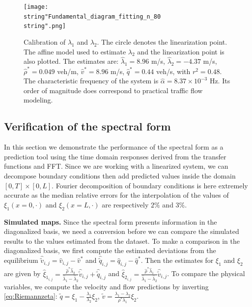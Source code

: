 \documentclass[5p,twocolumn]{elsarticle}
\begin{document}
\begin{figure}
\centering
\texttt{[image: \\string"Fundamental\_diagram\_fitting\_n\_80\\string".png]}
\protect\caption{Calibration of $\lambda_{1}$ and $\lambda_{2}$. The circle denotes the linearization point. The affine model used to estimate $\lambda_{2}$ and the linearization point is also plotted. The estimates are: $\widehat{\lambda}_{1}=8.96$ m/s, $\widehat{\lambda}_{2}=-4.37$ m/s, $\widehat{\rho}^{*}=0.049$ veh/m, $\widehat{v}^{*}=8.96$ m/s, $\widehat{q}^{*}=0.44$ veh/s, with $r^{2}=0.48$. The characteristic frequency of the system is $\widehat{\alpha} = 8.37\times10^{-3}$ Hz. Its order of magnitude does correspond to practical traffic flow modeling.}
\label{fig:Calibration-of-eigen-values}
\end{figure}

\subsection{Verification of the spectral form}
In this section we demonstrate the performance of the spectral form as a prediction tool using the time domain responses derived from the transfer functions and FFT. Since we are working with a linearized system, we can decompose boundary conditions then add predicted values inside the domain $\left[0,T\right]\times\left[0,L\right]$. Fourier decomposition of boundary conditions is here extremely accurate as the median relative errors for the interpolation of the values of $\xi_{1}\left(x=0, \cdot \right)$ and $\xi_{2}\left(x=L, \cdot \right)$ are respectively $2\%$ and $3\%$.

\textbf{Simulated maps.} Since the spectral form presents information in the diagonalized basis, we need a conversion before we can compare the simulated results to the values estimated from the dataset.  
To make a comparison in the diagonalized basis, we first compute the estimated deviations from the equilibrium $\widehat{\widetilde{v}}_{i,j}=\widehat{v}_{i,j}-\widehat{v}^{*}$ and $\widehat{\widetilde{q}}_{i,j}=\widehat{q}_{i,j}-\widehat{q}^{*}$. Then the estimates for $\xi_{1}$ and $\xi_{2}$ are given by $\widehat{\xi}_{1_{i,j}}=\frac{\widehat{\rho}^{*}\widehat{\lambda}_{2}}{\widehat{\lambda}_{1}-\widehat{\lambda}_{2}}\widehat{\widetilde{v}}_{i,j}+\widehat{\widetilde{q}}_{i,j}$ and
$\widehat{\xi}_{2_{i,j}}=\frac{\widehat{\rho}^{*}\widehat{\lambda}_{1}}{\widehat{\lambda}_{1}-\widehat{\lambda}_{2}}\widehat{\widetilde{v}}_{i,j}$. To compare the physical variables, we compute the velocity and flow predictions by inverting \eqref{eq:Riemannzeta}: $\widetilde{q}=\xi_{1}-\frac{\lambda_{1}}{\lambda_{2}}\xi_{2}$,
$\widetilde{v}=\frac{\lambda_{1}-\lambda_{2}}{\rho^{*}\lambda_{1}}\xi_{2}$.
\end{document}
